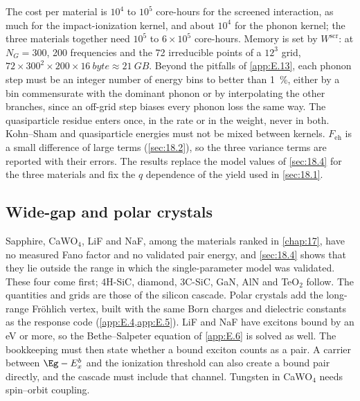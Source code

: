 The cost per material is $10^4$ to $10^5$ core-hours for the screened interaction, as much for the impact-ionization kernel, and about $10^4$ for the phonon kernel; the three materials together need $10^5$ to $6\times10^5$ core-hours. Memory is set by $W^{\mathrm{scr}}$: at $N_G = 300$, 200 frequencies and the 72 irreducible points of a $12^3$ grid, $72\times300^2\times200\times\SI{16}{byte} \approx \SI{21}{GB}$. Beyond the pitfalls of \cref{app:E.13}, each phonon step must be an integer number of energy bins to better than \SI{1}{\percent}, either by a bin commensurate with the dominant phonon or by interpolating the other branches, since an off-grid step biases every phonon loss the same way. The quasiparticle residue enters once, in the rate or in the weight, never in both. Kohn--Sham and quasiparticle energies must not be mixed between kernels. $F_{\mathrm{eh}}$ is a small difference of large terms (\cref{sec:18.2}), so the three variance terms are reported with their errors. The results replace the model values of \cref{sec:18.4} for the three materials and fix the $q$ dependence of the yield used in \cref{sec:18.1}.

\subsection{Wide-gap and polar crystals}

Sapphire, CaWO$_4$, LiF and NaF, among the materials ranked in \cref{chap:17}, have no measured Fano factor and no validated pair energy, and \cref{sec:18.4} shows that they lie outside the range in which the single-parameter model was validated. These four come first; 4H-SiC, diamond, 3C-SiC, GaN, AlN and TeO$_2$ follow. The quantities and grids are those of the silicon cascade. Polar crystals add the long-range Fr\"ohlich vertex, built with the same Born charges and dielectric constants as the response code (\cref{app:E.4,app:E.5}). LiF and NaF have excitons bound by an eV or more, so the Bethe--Salpeter equation of \cref{app:E.6} is solved as well. The bookkeeping must then state whether a bound exciton counts as a pair. A carrier between $\Eg - E_x^b$ and the ionization threshold can also create a bound pair directly, and the cascade must include that channel. Tungsten in CaWO$_4$ needs spin--orbit coupling.


